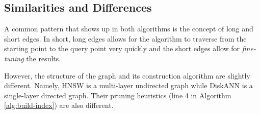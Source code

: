 

\subsection{Similarities and Differences}

A common pattern that shows up in both algorithms is the concept of long and short edges. In short, long edges allows for the algorithm to traverse from the starting point to the query point very quickly and the short edges allow for \textit{fine-tuning} the results.

However, the structure of the graph and its construction algorithm are slightly different. Namely, HNSW is a multi-layer undirected graph while DiskANN is a single-layer directed graph. Their pruning heuristics (line 4 in Algorithm \ref{alg:build-index}) are also different.
